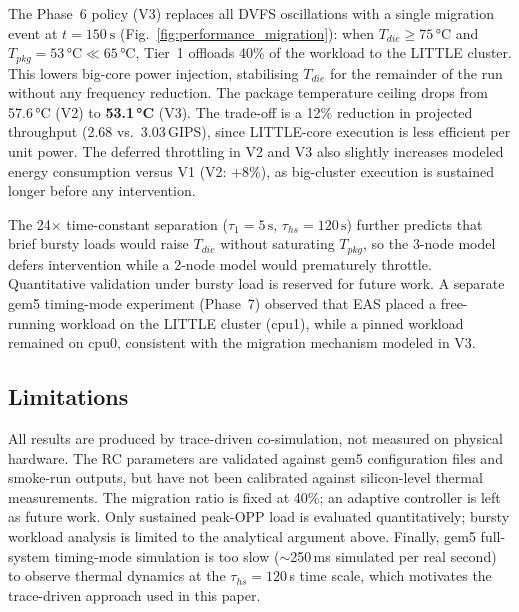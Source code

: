 The Phase~6 policy (V3) replaces all DVFS oscillations with a single migration event at $t = \SI{150}{\second}$ (Fig.~\ref{fig:performance_migration}): when $T_{die} \geq 75\,\text{°C}$ and $T_{pkg} = 53\,\text{°C} \ll 65\,\text{°C}$, Tier~1 offloads 40\% of the workload to the LITTLE cluster. This lowers big-core power injection, stabilising $T_{die}$ for the remainder of the run without any frequency reduction. The package temperature ceiling drops from 57.6\,°C (V2) to \textbf{53.1\,°C} (V3). The trade-off is a 12\% reduction in projected throughput (2.68 vs.\ 3.03\,GIPS), since LITTLE-core execution is less efficient per unit power. The deferred throttling in V2 and V3 also slightly increases modeled energy consumption versus V1 (V2: +8\%), as big-cluster execution is sustained longer before any intervention.

The 24$\times$ time-constant separation ($\tau_1 = 5\,\text{s}$, $\tau_{hs} = 120\,\text{s}$) further predicts that brief bursty loads would raise $T_{die}$ without saturating $T_{pkg}$, so the 3-node model defers intervention while a 2-node model would prematurely throttle. Quantitative validation under bursty load is reserved for future work. A separate gem5 timing-mode experiment (Phase~7) observed that EAS placed a free-running workload on the LITTLE cluster (cpu1), while a pinned workload remained on cpu0, consistent with the migration mechanism modeled in V3.

\subsection{Limitations}
All results are produced by trace-driven co-simulation, not measured on physical hardware. The RC parameters are validated against gem5 configuration files and smoke-run outputs, but have not been calibrated against silicon-level thermal measurements. The migration ratio is fixed at 40\%; an adaptive controller is left as future work. Only sustained peak-OPP load is evaluated quantitatively; bursty workload analysis is limited to the analytical argument above. Finally, gem5 full-system timing-mode simulation is too slow ($\sim$250\,ms simulated per real second) to observe thermal dynamics at the $\tau_{hs} = 120$\,s time scale, which motivates the trace-driven approach used in this paper.
